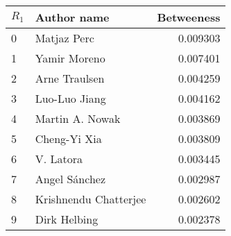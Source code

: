 \begin{tabular}{llr}
\toprule
\(R_1\) &            Author name &  Betweeness \\
\midrule
0 &            Matjaz Perc &    0.009303 \\
1 &           Yamir Moreno &    0.007401 \\
2 &          Arne Traulsen &    0.004259 \\
3 &          Luo-Luo Jiang &    0.004162 \\
4 &        Martin A. Nowak &    0.003869 \\
5 &           Cheng-Yi Xia &    0.003809 \\
6 &              V. Latora &    0.003445 \\
7 &          Angel Sánchez &    0.002987 \\
8 &  Krishnendu Chatterjee &    0.002602 \\
9 &           Dirk Helbing &    0.002378 \\
\bottomrule
\end{tabular}
